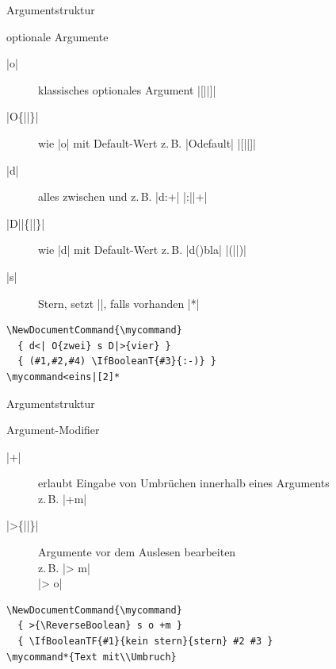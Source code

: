 \documentclass[
	vorläufig=true,
	datum=2017-01-26,
	titel={Komplexe Makros und Befehle},
	web=true,
	max,
]{../tex/latexkurs-slides}
\begin{document}
\begin{frame}[fragile]{Argumentstruktur}
\begin{block}{optionale Argumente}
\begin{description}
\item[|o|] klassisches optionales Argument \hfill |[||]|
\item[|O\{||\}|] wie |o| mit Default-Wert \quad z.\,B. |O{default}| \hfill |[||]|
\item[|d|] alles zwischen  und \quad
	z.\,B. |d:+| \hfill |:||+|
\item[|D||\{||\}|] wie |d| mit Default-Wert \quad
	z.\,B. |d(){bla}| \hfill |(||)|
\item[|s|] Stern, setzt |\BooleanTrue|, falls vorhanden \hfill |*|
\end{description}
\end{block}
\vfill
\begin{lstlisting}
\NewDocumentCommand{\mycommand}
  { d<| O{zwei} s D|>{vier} }
  { (#1,#2,#4) \IfBooleanT{#3}{:-)} }
\mycommand<eins|[2]*
\end{lstlisting}
\end{frame}

\begin{frame}[fragile]{Argumentstruktur}
\begin{block}{Argument-Modifier}
\begin{description}
\item[|+|] erlaubt Eingabe von Umbrüchen innerhalb eines Arguments \\
	z.\,B. |+m|
\item[|>\{||\}|] Argumente vor dem Auslesen bearbeiten \\
	z.\,B. |> {\ReverseBoolean} m|\\|> {\TrimSpaces} o|
\end{description}
\end{block}
\hfill
\begin{lstlisting}
\NewDocumentCommand{\mycommand}
  { >{\ReverseBoolean} s o +m }
  { \IfBooleanTF{#1}{kein stern}{stern} #2 #3 }
\mycommand*{Text mit\\Umbruch}
\end{lstlisting}
\end{frame}
\end{document}
